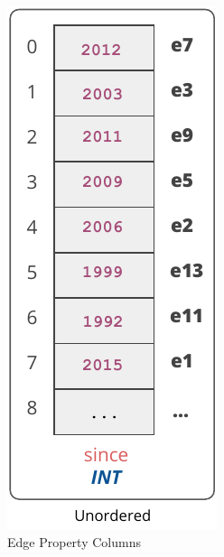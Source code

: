 \begin{figure}
	\hspace*{-20pt}
	\begin{subfigure}{0.45\textwidth}
		\vspace{14pt}
		\centering
		\includegraphics[scale=0.75]{img/sol1}
		\captionsetup{justification=centering}
		\vspace{12pt}
		\caption{Edge Property Columns}
		\label{fig:sol1}
	\end{subfigure}
	\begin{subfigure}{0.55\textwidth}
		\centering

\end{subfigure}
\end{figure}
